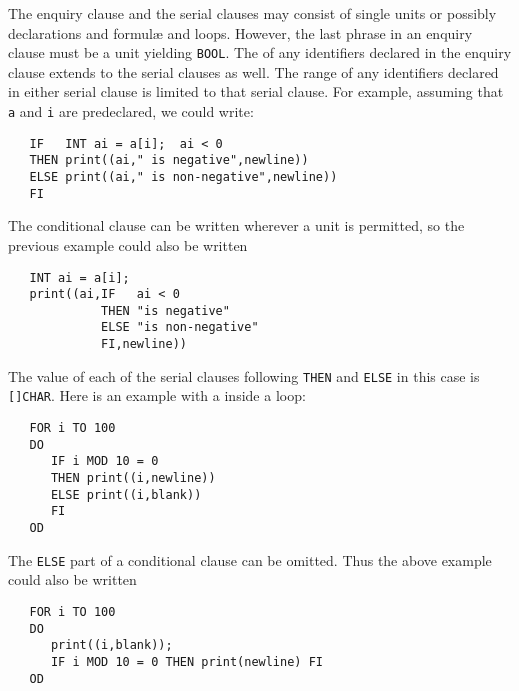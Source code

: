 The enquiry clause and the serial clauses may consist of single units
or possibly declarations and formul{\ae} and loops. However, the last
phrase in an enquiry clause must be a unit yielding \verb|BOOL|. The
 of any identifiers declared in the enquiry clause extends
to the serial clauses as well.  The range of any identifiers declared
in either serial clause is limited to that serial clause.  For
example, assuming that \verb|a| and \verb|i| are predeclared, we
could write:
\begin{verbatim}
   IF   INT ai = a[i];  ai < 0
   THEN print((ai," is negative",newline))
   ELSE print((ai," is non-negative",newline))
   FI
\end{verbatim}
\noindent
The conditional clause can be written wherever a unit is permitted,
so the previous example could also be written
\begin{verbatim}
   INT ai = a[i];
   print((ai,IF   ai < 0
             THEN "is negative"
             ELSE "is non-negative"
             FI,newline))
\end{verbatim}
\noindent
The value of each of the serial clauses following \verb|THEN| and
\verb|ELSE| in this case is \verb|[]CHAR|. Here is an example with a
 inside a loop:
\begin{verbatim}
   FOR i TO 100
   DO
      IF i MOD 10 = 0
      THEN print((i,newline))
      ELSE print((i,blank))
      FI
   OD
\end{verbatim}
\noindent
The \verb|ELSE| part of a conditional clause can be omitted. Thus the
above example could also be written
\begin{verbatim}
   FOR i TO 100
   DO
      print((i,blank));
      IF i MOD 10 = 0 THEN print(newline) FI
   OD
\end{verbatim}

